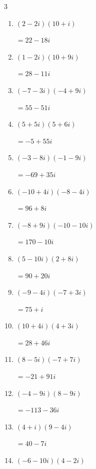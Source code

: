 \begin{multicols}{3}
\begin{enumerate}
\resetques

  \item $\displaystyle (2-2i)(10+i)$

        $\displaystyle =22-18i$

  \item $\displaystyle (1-2i)(10+9i)$

        $\displaystyle =28-11i$

  \item $\displaystyle (-7-3i)(-4+9i)$

        $\displaystyle =55-51i$

  \item $\displaystyle (5+5i)(5+6i)$

        $\displaystyle =-5+55i$

  \item $\displaystyle (-3-8i)(-1-9i)$

        $\displaystyle =-69+35i$

  \item $\displaystyle (-10+4i)(-8-4i)$

        $\displaystyle =96+8i$

  \item $\displaystyle (-8+9i)(-10-10i)$

        $\displaystyle =170-10i$

  \item $\displaystyle (5-10i)(2+8i)$

        $\displaystyle =90+20i$

  \item $\displaystyle (-9-4i)(-7+3i)$

        $\displaystyle =75+i$

  \item $\displaystyle (10+4i)(4+3i)$

        $\displaystyle =28+46i$

  \item $\displaystyle (8-5i)(-7+7i)$

        $\displaystyle =-21+91i$

  \item $\displaystyle (-4-9i)(8-9i)$

        $\displaystyle =-113-36i$

  \item $\displaystyle (4+i)(9-4i)$

        $\displaystyle =40-7i$

  \item $\displaystyle (-6-10i)(4-2i)$


\end{enumerate}
\end{multicols}

